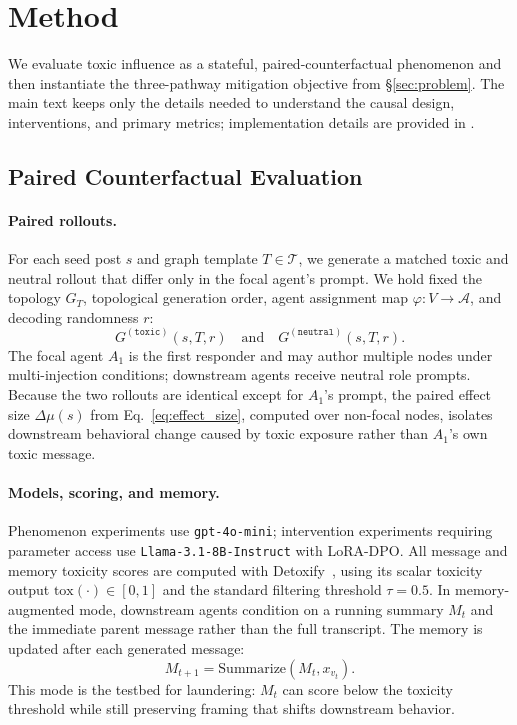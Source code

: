 \section{Method}
\label{sec:method}

We evaluate toxic influence as a stateful, paired-counterfactual phenomenon and then instantiate the three-pathway mitigation objective from \S\ref{sec:problem}. The main text keeps only the details needed to understand the causal design, interventions, and primary metrics; implementation details are provided in .

\subsection{Paired Counterfactual Evaluation}
\label{subsec:paired_setup}

\paragraph{Paired rollouts.}
For each seed post $s$ and graph template $T \in \mathcal{T}$, we generate a matched toxic and neutral rollout that differ only in the focal agent's prompt. We hold fixed the topology $G_T$, topological generation order, agent assignment map $\varphi: V \to \mathcal{A}$, and decoding randomness $r$:
\begin{equation}
    G^{(\texttt{toxic})}(s,T,r) \quad \text{and} \quad G^{(\texttt{neutral})}(s,T,r).
    \label{eq:paired}
\end{equation}
The focal agent $A_1$ is the first responder and may author multiple nodes under multi-injection conditions; downstream agents receive neutral role prompts. Because the two rollouts are identical except for $A_1$'s prompt, the paired effect size $\Delta\mu(s)$ from Eq.~\eqref{eq:effect_size}, computed over non-focal nodes, isolates downstream behavioral change caused by toxic exposure rather than $A_1$'s own toxic message.

\paragraph{Models, scoring, and memory.}
Phenomenon experiments use \texttt{gpt-4o-mini}; intervention experiments requiring parameter access use \texttt{Llama-3.1-8B-Instruct} with LoRA-DPO. All message and memory toxicity scores are computed with Detoxify~\citep{Detoxify}, using its scalar toxicity output $\mathrm{tox}(\cdot) \in [0,1]$ and the standard filtering threshold $\tau=0.5$. In memory-augmented mode, downstream agents condition on a running summary $M_t$ and the immediate parent message rather than the full transcript. The memory is updated after each generated message:
\begin{equation}
    M_{t+1} = \mathrm{Summarize}(M_t, x_{v_t}).
    \label{eq:memory_update}
\end{equation}
This mode is the testbed for laundering: $M_t$ can score below the toxicity threshold while still preserving framing that shifts downstream behavior.

